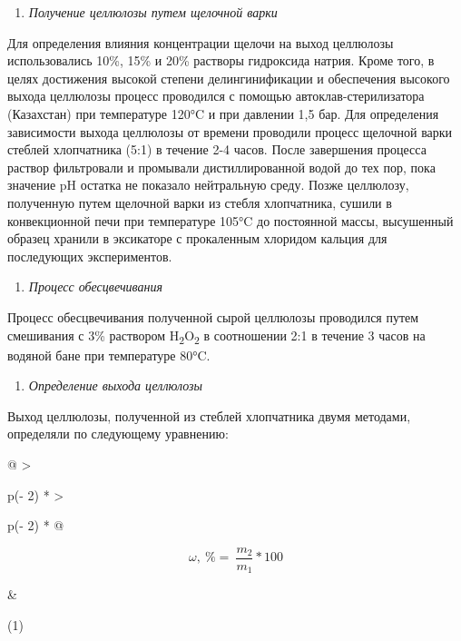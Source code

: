 \begin{enumerate}
\def\labelenumi{\arabic{enumi}.}
\setcounter{enumi}{1}
\item
  \emph{Получение целлюлозы путем щелочной варки}
\end{enumerate}

Для определения влияния концентрации щелочи на выход целлюлозы
использовались 10\%, 15\% и 20\% растворы гидроксида натрия. Кроме того,
в целях достижения высокой степени делингинификации и обеспечения
высокого выхода целлюлозы процесс проводился с помощью
автоклав-стерилизатора (Казахстан) при температуре 120°C и при давлении
1,5 бар. Для определения зависимости выхода целлюлозы от времени
проводили процесс щелочной варки стеблей хлопчатника (5:1) в течение 2-4
часов. После завершения процесса раствор фильтровали и промывали
дистиллированной водой до тех пор, пока значение pH остатка не показало
нейтральную среду. Позже целлюлозу, полученную путем щелочной варки из
стебля хлопчатника, сушили в конвекционной печи при температуре 105°C до
постоянной массы, высушенный образец хранили в эксикаторе с прокаленным
хлоридом кальция для последующих экспериментов.

\begin{enumerate}
\def\labelenumi{\arabic{enumi}.}
\setcounter{enumi}{2}
\item
  \emph{Процесс обесцвечивания}
\end{enumerate}

Процесс обесцвечивания полученной сырой целлюлозы проводился путем
смешивания с 3\% раствором H\textsubscript{2}O\textsubscript{2} в
соотношении 2:1 в течение 3 часов на водяной бане при температуре 80°C.

\begin{enumerate}
\def\labelenumi{\arabic{enumi}.}
\setcounter{enumi}{3}
\item
  \emph{Определение выхода целлюлозы}
\end{enumerate}

Выход целлюлозы, полученной из стеблей хлопчатника двумя методами,
определяли по следующему уравнению:

\begin{longtable}[]{@{}
  >{\raggedright\arraybackslash}p{(\columnwidth - 2\tabcolsep) * }
  >{\raggedright\arraybackslash}p{(\columnwidth - 2\tabcolsep) * }@{}}
\toprule\noalign{}
\begin{minipage}[b]{\linewidth}\raggedright
\[\omega,\ \% = \ \frac{m_{2}}{m_{1}}*100\]
\end{minipage} & \begin{minipage}[b]{\linewidth}\raggedright
(1)
\end{minipage} \\
\midrule\noalign{}
\endhead
\bottomrule\noalign{}
\endlastfoot
\end{longtable}

